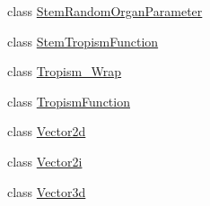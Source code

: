 \begin{DoxyCompactItemize}
\item 
class \hyperlink{classCPlantBox_1_1StemRandomOrganParameter}{Stem\+Random\+Organ\+Parameter}
\item 
class \hyperlink{classCPlantBox_1_1StemTropismFunction}{Stem\+Tropism\+Function}
\item 
class \hyperlink{classCPlantBox_1_1Tropism__Wrap}{Tropism\+\_\+\+Wrap}
\item 
class \hyperlink{classCPlantBox_1_1TropismFunction}{Tropism\+Function}
\item 
class \hyperlink{classCPlantBox_1_1Vector2d}{Vector2d}
\item 
class \hyperlink{classCPlantBox_1_1Vector2i}{Vector2i}
\item 
class \hyperlink{classCPlantBox_1_1Vector3d}{Vector3d}
\end{DoxyCompactItemize}
